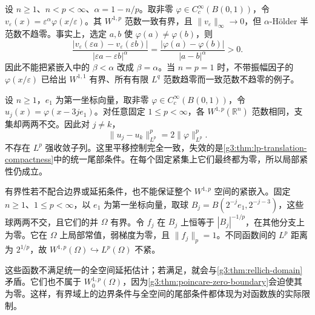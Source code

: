 \begin{example}\label{g3:exm:morrey-endpoint-noncompact}
	设 \(n\ge1\)、\(n<p<\infty\)、\(\alpha=1-n/p\)。取非零 \(\varphi\in C_c^\infty(B(0,1))\)，令 \(v_\varepsilon(x)=\varepsilon^\alpha\varphi(x/\varepsilon)\)。其 \(W^{1,p}\) 范数一致有界，且 \(\|v_\varepsilon\|_\infty\to0\)，但 \(\alpha\)-Hölder 半范数不趋零。事实上，选定 \(a,b\) 使 \(\varphi(a)\ne\varphi(b)\)，则
	\[
		\frac{|v_\varepsilon(\varepsilon a)-v_\varepsilon(\varepsilon b)|}
		{|\varepsilon a-\varepsilon b|^\alpha}
		=\frac{|\varphi(a)-\varphi(b)|}{|a-b|^\alpha}>0.
	\]
	因此不能把紧嵌入中的 \(\beta<\alpha\) 改成 \(\beta=\alpha\)。当 \(n=p=1\) 时，不带振幅因子的 \(\varphi(x/\varepsilon)\) 已给出 \(W^{1,1}\) 有界、所有有限 \(L^q\) 范数趋零而一致范数不趋零的例子。
\end{example}

\begin{example}\label{g3:exm:sobolev-escape-infinity}
	设 \(n\ge1\)，\(e_1\) 为第一坐标向量，取非零 \(\varphi\in C_c^\infty(B(0,1))\)，令 \(u_j(x)=\varphi(x-3je_1)\)。对任意固定 \(1\le p<\infty\)，各 \(W^{1,p}(\mathbb R^n)\) 范数相同，支集却两两不交。因此对 \(j\ne k\)，
	\[
		\|u_j-u_k\|_{L^p}^p=2\|\varphi\|_{L^p}^p.
	\]
	不存在 \(L^p\) 强收敛子列。这里平移控制完全一致，失效的是\cref{g3:thm:lp-translation-compactness}中的统一尾部条件。在每个固定紧集上它们最终都为零，所以局部紧性仍成立。
\end{example}

\begin{example}\label{g3:exm:bounded-disconnected-rellich-failure}
	有界性若不配合边界或延拓条件，也不能保证整个 \(W^{1,p}\) 空间的紧嵌入。固定 \(n\ge1\)、\(1\le p<\infty\)，以 \(e_1\) 为第一坐标向量，取球
	\(B_j=B(2^{-j}e_1,2^{-j-3})\)，这些球两两不交，且它们的并 \(\Omega\) 有界。令 \(f_j\) 在 \(B_j\) 上恒等于 \(|B_j|^{-1/p}\)，在其他分支上为零。它在 \(\Omega\) 上局部常值，弱梯度为零，且 \(\|f_j\|_p=1\)。不同函数间的 \(L^p\) 距离为 \(2^{1/p}\)，故 \(W^{1,p}(\Omega)\hookrightarrow L^p(\Omega)\) 不紧。

	这些函数不满足统一的全空间延拓估计；若满足，就会与\cref{g3:thm:rellich-domain}矛盾。它们也不属于 \(W^{1,p}_0(\Omega)\)，因为\cref{g3:thm:poincare-zero-boundary}会迫使其为零。这样，有界域上的边界条件与全空间的尾部条件都体现为对函数族的实际限制。
\end{example}
